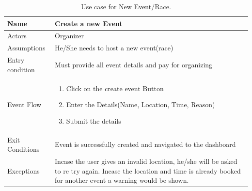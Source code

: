 
\begin{table}[H]
\begin{tabular}{| l | p{} |}
\hline
Name & Create a new Event\\
\hline
Actors & Organizer\\
\hline
Assumptions & He/She needs to host a new event(race)\\
\hline
Entry condition & Must provide all event details and pay for organizing\\
\hline
Event Flow & \begin{enumerate}
\item Click on the create event Button
\item Enter the Details(Name, Location, Time, Reason)
\item Submit the details 
\end{enumerate}
\\
\hline
Exit Conditions & Event is successfully created and navigated to the dashboard\\
\hline
Exceptions & Incase the user gives an invalid location, he/she will be asked to re try again. Incase the location and time is already booked for another event a warning would be shown. \\
\hline
\end{tabular}
\caption{Use case for New Event/Race.}
\label{usecase-new-event/race}
\end{table}


